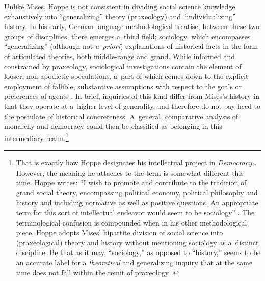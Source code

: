 Unlike Mises, Hoppe is not consistent in dividing social science knowledge exhaustively into ``generalizing'' theory (praxeology) and ``individualizing'' history. In his early, German-language methodological treatise, between these two groups of disciplines, there emerges a~third field: sociology, which encompasses ``generalizing'' (although not \textit{a~priori}) explanations of historical facts in the form of articulated theories, both middle-range and grand. While informed and constrained by praxeology, sociological investigations contain the element of looser, non-apodictic speculations, a~part of which comes down to the explicit employment of fallible, substantive assumptions with respect to the goals or preferences of agents 
\parencite[][pp.33–38]{hoppe_kritik_1983}. %
 In brief, inquiries of this kind differ from Mises's history in that they operate at a~higher level of generality, and therefore do not pay heed to the postulate of historical concreteness. A~general, comparative analysis of monarchy and democracy could then be classified as belonging in this intermediary realm.\footnote{That is exactly how Hoppe designates his intellectual project in \textit{Democracy}… However, the meaning he attaches to the term is somewhat different this time. Hoppe writes: ``I wish to promote and contribute to the tradition of grand social theory, encompassing political economy, political philosophy and history and including normative as well as positive questions. An appropriate term for this sort of intellectual endeavor would seem to be sociology'' 
\parencite[][p.xxiv]{hoppe_democracy_2007}. %
 The terminological confusion is compounded when in his other methodological piece, Hoppe 
\parencite[][p.43]{hoppe_economic_2007} %
 adopts Mises' bipartite division of social science into (praxeological) theory and history without mentioning sociology as a~distinct discipline. Be that as it may, ``sociology,'' as opposed to ``history,'' seems to be an accurate label for a \textit{theoretical} and generalizing inquiry that at the same time does not fall within the remit of praxeology 
\parencite[on the standing of sociology in thesee][]{robitaille_ludwig_2019}.%
}




